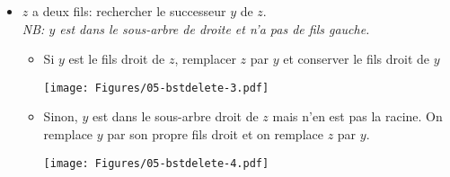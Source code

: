 \begin{frame}
\begin{itemize}
\item $z$ a deux fils: rechercher le successeur $y$ de $z$.\\\emph{NB: $y$ est dans le sous-arbre de droite et n'a pas de fils gauche.}
\begin{itemize}
\item Si $y$ est le fils droit de $z$, remplacer $z$ par $y$ et conserver le fils droit de $y$
\centerline{\texttt{[image: Figures/05-bstdelete-3.pdf]}}
\item Sinon, $y$ est dans le sous-arbre droit de $z$ mais n'en est pas la racine. On remplace $y$ par son propre fils droit et on remplace $z$ par $y$.
\centerline{\texttt{[image: Figures/05-bstdelete-4.pdf]}}
\end{itemize}
\end{itemize}
\end{frame}

